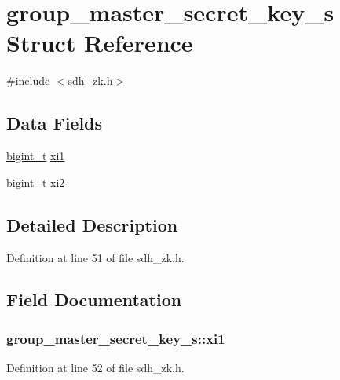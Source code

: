\hypertarget{structgroup__master__secret__key__s}{\section{group\-\_\-master\-\_\-secret\-\_\-key\-\_\-s Struct Reference}
\label{structgroup__master__secret__key__s}
}


{\ttfamily \#include $<$sdh\-\_\-zk.\-h$>$}

\subsection*{Data Fields}
\begin{DoxyCompactItemize}
\item 
\hyperlink{types_8h_a7ae8816fa287bc4a98dec462acd2ad28}{bigint\-\_\-t} \hyperlink{structgroup__master__secret__key__s_afe6553f23fcfa7471bc05bc50321e71c}{xi1}
\item 
\hyperlink{types_8h_a7ae8816fa287bc4a98dec462acd2ad28}{bigint\-\_\-t} \hyperlink{structgroup__master__secret__key__s_ab2d94234b3ba26944f321a5399adcf99}{xi2}
\end{DoxyCompactItemize}


\subsection{Detailed Description}


Definition at line 51 of file sdh\-\_\-zk.\-h.



\subsection{Field Documentation}
\hypertarget{structgroup__master__secret__key__s_afe6553f23fcfa7471bc05bc50321e71c}{
\subsubsection[{xi1}]{ group\-\_\-master\-\_\-secret\-\_\-key\-\_\-s\-::xi1}}\label{structgroup__master__secret__key__s_afe6553f23fcfa7471bc05bc50321e71c}


Definition at line 52 of file sdh\-\_\-zk.\-h.



